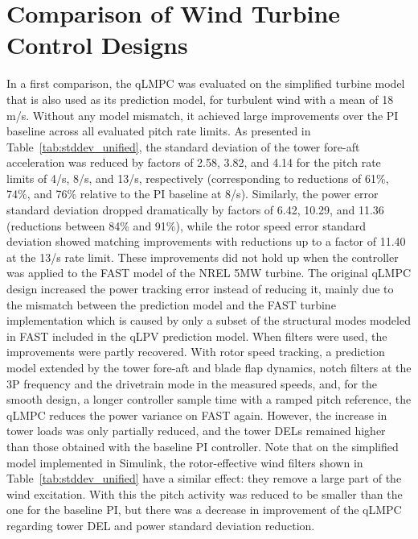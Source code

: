 \section{Comparison of Wind Turbine Control Designs}
\label{subsec:ComparisonWindTurbineControlDesigns}

In a first comparison, the qLMPC was evaluated on the simplified turbine model that is also
used as its prediction model, for turbulent wind with a mean of 18\,m/s. Without any model
mismatch, it achieved large improvements over the PI baseline across all evaluated pitch rate limits.
As presented in Table~\ref{tab:stddev_unified}, the standard deviation of the tower fore-aft acceleration was reduced
by factors of 2.58, 3.82, and 4.14 for the pitch rate limits of 4\textdegree/s, 8\textdegree/s, and
13\textdegree/s, respectively (corresponding to reductions of 61\%, 74\%, and 76\% relative to the
PI baseline at 8\textdegree/s). Similarly, the power error standard deviation dropped dramatically
by factors of 6.42, 10.29, and 11.36 (reductions between 84\% and 91\%), while the rotor speed error
standard deviation showed matching improvements with reductions up to a factor of 11.40 at the
13\textdegree/s rate limit. These improvements did not hold up when the controller was applied to the FAST model of the NREL 5MW
turbine. The original qLMPC design increased the power tracking error instead of reducing it,
mainly due to the mismatch between the prediction model and the FAST turbine implementation which is caused by only a subset of the structural modes modeled in FAST included in the qLPV prediction model. When filters were used, the
improvements were partly recovered. With rotor speed tracking, a prediction model extended by the tower fore-aft and
blade flap dynamics, notch filters at the 3P frequency and the drivetrain mode in the measured
speeds, and, for the smooth design, a longer controller sample time with a ramped pitch
reference, the qLMPC reduces the power variance on FAST again. However, the increase in tower
loads was only partially reduced, and the tower DELs remained higher than those obtained with the baseline PI controller. Note that on the simplified model implemented in Simulink, the
rotor-effective wind filters shown in Table~\ref{tab:stddev_unified} have a similar effect: they
remove a large part of the wind excitation. With this the pitch activity was reduced to be smaller than the one for the baseline PI, but there was a decrease in improvement of the
qLMPC regarding tower DEL and power standard deviation reduction.

